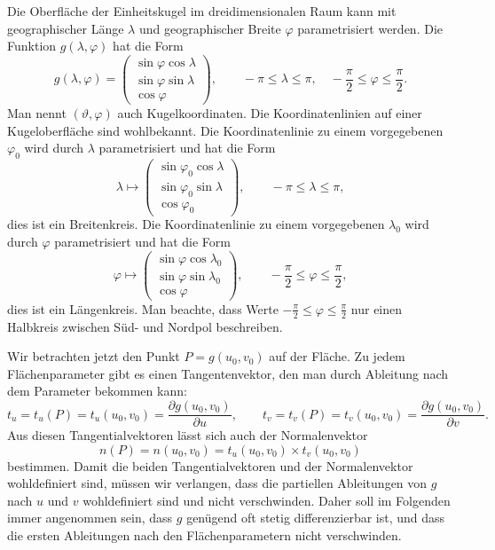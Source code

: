 \begin{beispiel}
Die Oberfläche der Einheitskugel im dreidimensionalen Raum kann mit
geographischer Länge $\lambda$ und geographischer Breite $\varphi$
parametrisiert werden.
%
%
%
%
%
Die Funktion $g(\lambda,\varphi)$ hat die Form
\begin{equation}
g(\lambda,\varphi)
=
\begin{pmatrix}
\sin\varphi\cos\lambda\\
\sin\varphi\sin\lambda\\
\cos\varphi
\end{pmatrix},\qquad
-\pi \le \lambda \le \pi,\quad
-\frac{\pi}2 \le \varphi \le \frac{\pi}2
.
\end{equation}
Man nennt $(\vartheta,\varphi)$ auch Kugelkoordinaten.
%
Die Koordinatenlinien auf einer Kugeloberfläche sind wohlbekannt. 
Die Koordinatenlinie zu einem vorgegebenen $\varphi_0$ wird durch
$\lambda$ parametrisiert und hat die Form
\[
\lambda
\mapsto
\begin{pmatrix}
\sin\varphi_0\cos\lambda\\
\sin\varphi_0\sin\lambda\\
\cos\varphi_0
\end{pmatrix},\qquad -\pi\le\lambda\le\pi,
\]
dies ist ein Breitenkreis.
%
Die Koordinatenlinie zu einem vorgegebenen $\lambda_0$ wird durch
$\varphi$ parametrisiert und hat die Form
\[
\varphi
\mapsto
\begin{pmatrix}
\sin\varphi\cos\lambda_0\\
\sin\varphi\sin\lambda_0\\
\cos\varphi
\end{pmatrix},\qquad -\frac{\pi}2 \le \varphi\le \frac{\pi}2,
\]
dies ist ein Längenkreis.
%
Man beachte, dass Werte $-\frac{\pi}2\le \varphi \le \frac{\pi}2$ nur einen
Halbkreis zwischen Süd- und Nordpol beschreiben.
\end{beispiel}

Wir betrachten jetzt den Punkt $P=g(u_0,v_0)$ auf der Fläche.
Zu jedem Flächenparameter gibt es einen Tangentenvektor, den man durch
Ableitung nach dem Parameter bekommen kann:
\begin{equation}
t_u
=
t_u(P)
=
t_u(u_0,v_0)
=
\frac{\partial g(u_0,v_0)}{\partial u},
\qquad
t_v
=
t_v(P)
=
t_v(u_0,v_0)
=
\frac{\partial g(u_0,v_0)}{\partial v}.
\end{equation}
Aus diesen Tangentialvektoren lässt sich auch der Normalenvektor
\begin{equation}
n(P) = n(u_0,v_0) = t_u(u_0,v_0) \times t_v(u_0,v_0)
\end{equation}
bestimmen.
Damit die beiden Tangentialvektoren und der Normalenvektor wohldefiniert sind,
müssen wir verlangen, dass die partiellen Ableitungen von $g$ nach $u$ und $v$
wohldefiniert sind und nicht verschwinden.
Daher soll im Folgenden immer angenommen sein, dass $g$ genügend oft stetig
differenzierbar ist, und dass die ersten Ableitungen nach den Flächenparametern
nicht verschwinden.

